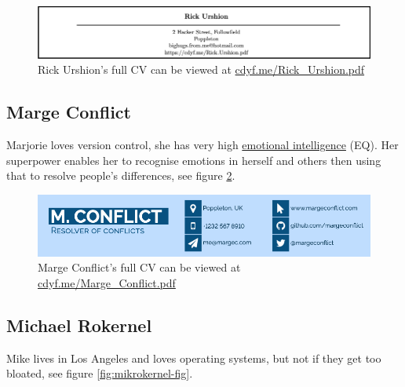 \documentclass[
]{book}
\begin{document}
\begin{figure}

{\centering \includegraphics[width=1\linewidth]{images/rick_urshion} 

}

\caption{Rick Urshion's full CV can be viewed at \href{https://www.cdyf.me/Rick_Urshion.pdf}{cdyf.me/Rick\_Urshion.pdf}}\label{fig:rickurshion-fig}
\end{figure}



\hypertarget{marge-conflict}{%
\subsection{Marge Conflict}\label{marge-conflict}}

Marjorie loves version control, she has very high \href{https://en.wikipedia.org/wiki/Emotional_intelligence}{emotional intelligence} (EQ). Her superpower enables her to recognise emotions in herself and others then using that to resolve people's differences, see figure \ref{fig:margeconflict-fig}.

\begin{figure}

{\centering \includegraphics[width=1\linewidth]{images/marge_conflict} 

}

\caption{Marge Conflict's full CV can be viewed at \href{https://www.cdyf.me/Marge_Conflict.pdf}{cdyf.me/Marge\_Conflict.pdf}}\label{fig:margeconflict-fig}
\end{figure}



\hypertarget{mike-rokernel}{%
\subsection{Michael Rokernel}\label{mike-rokernel}}

Mike lives in Los Angeles and loves operating systems, but not if they get too bloated, see figure \ref{fig:mikrokernel-fig}.
\end{document}
